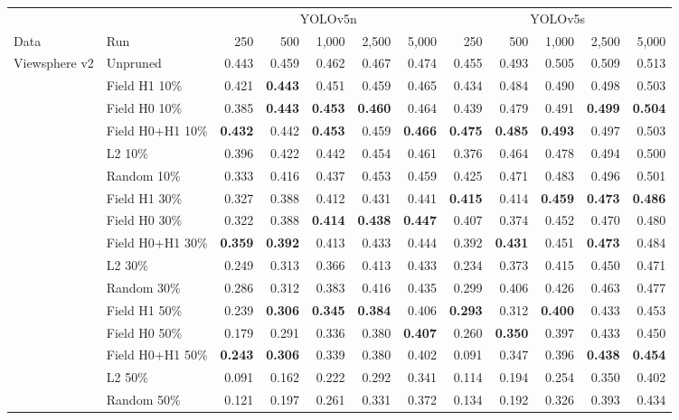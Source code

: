 \begin{tabular}{llrrrrrrrrrr}
\toprule
 & & \multicolumn{5}{c}{YOLOv5n} & \multicolumn{5}{c}{YOLOv5s} \\
\cmidrule(lr){3-7}\cmidrule(lr){8-12}
Data & Run & 250 & 500 & 1,000 & 2,500 & 5,000 & 250 & 500 & 1,000 & 2,500 & 5,000 \\
\midrule
Viewsphere v2 & Unpruned & 0.443 & 0.459 & 0.462 & 0.467 & 0.474 & 0.455 & 0.493 & 0.505 & 0.509 & 0.513 \\
 & Field H1 10\% & 0.421 & \textbf{0.443} & 0.451 & 0.459 & 0.465 & 0.434 & 0.484 & 0.490 & 0.498 & 0.503 \\
 & Field H0 10\% & 0.385 & \textbf{0.443} & \textbf{0.453} & \textbf{0.460} & 0.464 & 0.439 & 0.479 & 0.491 & \textbf{0.499} & \textbf{0.504} \\
 & Field H0+H1 10\% & \textbf{0.432} & 0.442 & \textbf{0.453} & 0.459 & \textbf{0.466} & \textbf{0.475} & \textbf{0.485} & \textbf{0.493} & 0.497 & 0.503 \\
 & L2 10\% & 0.396 & 0.422 & 0.442 & 0.454 & 0.461 & 0.376 & 0.464 & 0.478 & 0.494 & 0.500 \\
 & Random 10\% & 0.333 & 0.416 & 0.437 & 0.453 & 0.459 & 0.425 & 0.471 & 0.483 & 0.496 & 0.501 \\
\addlinespace[2pt]
 & Field H1 30\% & 0.327 & 0.388 & 0.412 & 0.431 & 0.441 & \textbf{0.415} & 0.414 & \textbf{0.459} & \textbf{0.473} & \textbf{0.486} \\
 & Field H0 30\% & 0.322 & 0.388 & \textbf{0.414} & \textbf{0.438} & \textbf{0.447} & 0.407 & 0.374 & 0.452 & 0.470 & 0.480 \\
 & Field H0+H1 30\% & \textbf{0.359} & \textbf{0.392} & 0.413 & 0.433 & 0.444 & 0.392 & \textbf{0.431} & 0.451 & \textbf{0.473} & 0.484 \\
 & L2 30\% & 0.249 & 0.313 & 0.366 & 0.413 & 0.433 & 0.234 & 0.373 & 0.415 & 0.450 & 0.471 \\
 & Random 30\% & 0.286 & 0.312 & 0.383 & 0.416 & 0.435 & 0.299 & 0.406 & 0.426 & 0.463 & 0.477 \\
\addlinespace[2pt]
 & Field H1 50\% & 0.239 & \textbf{0.306} & \textbf{0.345} & \textbf{0.384} & 0.406 & \textbf{0.293} & 0.312 & \textbf{0.400} & 0.433 & 0.453 \\
 & Field H0 50\% & 0.179 & 0.291 & 0.336 & 0.380 & \textbf{0.407} & 0.260 & \textbf{0.350} & 0.397 & 0.433 & 0.450 \\
 & Field H0+H1 50\% & \textbf{0.243} & \textbf{0.306} & 0.339 & 0.380 & 0.402 & 0.091 & 0.347 & 0.396 & \textbf{0.438} & \textbf{0.454} \\
 & L2 50\% & 0.091 & 0.162 & 0.222 & 0.292 & 0.341 & 0.114 & 0.194 & 0.254 & 0.350 & 0.402 \\
 & Random 50\% & 0.121 & 0.197 & 0.261 & 0.331 & 0.372 & 0.134 & 0.192 & 0.326 & 0.393 & 0.434 \\
\bottomrule
\end{tabular}
